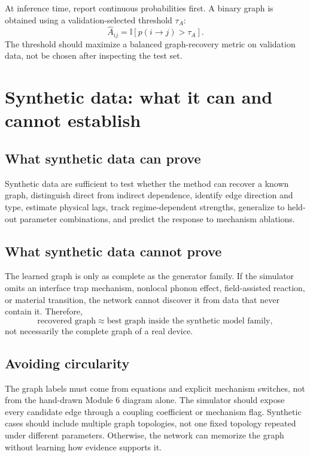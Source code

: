 \documentclass[11pt]{article}
\begin{document}
At inference time, report continuous probabilities first. A binary graph is obtained using a validation-selected threshold \(\tau_A\):
\begin{equation}
\widehat{A}_{ij}=\mathbb{I}\left[p(i\rightarrow j)>\tau_A\right].
\end{equation}
The threshold should maximize a balanced graph-recovery metric on validation data, not be chosen after inspecting the test set.

\section{Synthetic data: what it can and cannot establish}

\subsection{What synthetic data can prove}

Synthetic data are sufficient to test whether the method can recover a known graph, distinguish direct from indirect dependence, identify edge direction and type, estimate physical lags, track regime-dependent strengths, generalize to held-out parameter combinations, and predict the response to mechanism ablations.

\subsection{What synthetic data cannot prove}

The learned graph is only as complete as the generator family. If the simulator omits an interface trap mechanism, nonlocal phonon effect, field-assisted reaction, or material transition, the network cannot discover it from data that never contain it. Therefore,
\begin{equation}
\text{recovered graph}\approx\text{best graph inside the synthetic model family},
\end{equation}
not necessarily the complete graph of a real device.

\subsection{Avoiding circularity}

The graph labels must come from equations and explicit mechanism switches, not from the hand-drawn Module 6 diagram alone. The simulator should expose every candidate edge through a coupling coefficient or mechanism flag. Synthetic cases should include multiple graph topologies, not one fixed topology repeated under different parameters. Otherwise, the network can memorize the graph without learning how evidence supports it.
\end{document}
